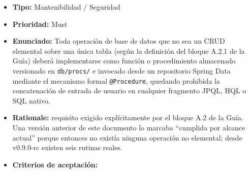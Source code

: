 \documentclass[
  spanish,
]{article}
\providecommand{\tightlist}{%
  \setlength{\itemsep}{0pt}\setlength{\parskip}{0pt}}
\begin{document}
\begin{itemize}
\tightlist
\item
  \textbf{Tipo:} Mantenibilidad / Seguridad
\item
  \textbf{Prioridad:} Must
\item
  \textbf{Enunciado:} Toda operación de base de datos que no sea un CRUD
  elemental sobre una única tabla (según la definición del bloque A.2.1
  de la Guía) deberá implementarse como función o procedimiento
  almacenado versionado en \texttt{db/\allowbreak{}procs/} e invocado desde un
  repositorio Spring Data mediante el mecanismo formal
  \texttt{@Procedure}, quedando prohibida la concatenación de entrada de
  usuario en cualquier fragmento JPQL, HQL o SQL nativo.
\item
  \textbf{Rationale:} requisito exigido explícitamente por el bloque A.2
  de la Guía. Una versión anterior de este documento lo marcaba
  ``cumplida por alcance actual'' porque entonces no existía ninguna
  operación no elemental; desde v0.9.0-rc existen seis rutinas reales.
\item
  \textbf{Criterios de aceptación:}


\end{itemize}
\end{document}
